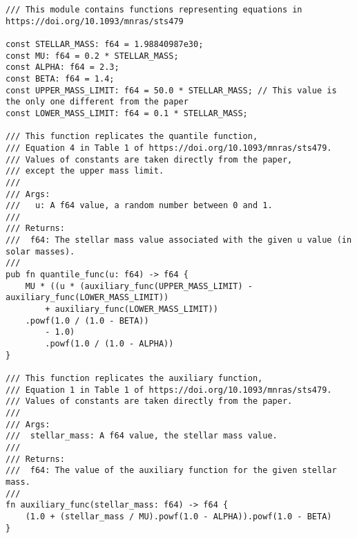 \begin{lstlisting}
/// This module contains functions representing equations in https://doi.org/10.1093/mnras/sts479

const STELLAR_MASS: f64 = 1.98840987e30;
const MU: f64 = 0.2 * STELLAR_MASS;
const ALPHA: f64 = 2.3;
const BETA: f64 = 1.4;
const UPPER_MASS_LIMIT: f64 = 50.0 * STELLAR_MASS; // This value is the only one different from the paper
const LOWER_MASS_LIMIT: f64 = 0.1 * STELLAR_MASS;

/// This function replicates the quantile function,
/// Equation 4 in Table 1 of https://doi.org/10.1093/mnras/sts479.
/// Values of constants are taken directly from the paper,
/// except the upper mass limit.
///
/// Args:
///   u: A f64 value, a random number between 0 and 1.
///
/// Returns:
///  f64: The stellar mass value associated with the given u value (in solar masses).
///
pub fn quantile_func(u: f64) -> f64 {
    MU * ((u * (auxiliary_func(UPPER_MASS_LIMIT) - auxiliary_func(LOWER_MASS_LIMIT))
        + auxiliary_func(LOWER_MASS_LIMIT))
    .powf(1.0 / (1.0 - BETA))
        - 1.0)
        .powf(1.0 / (1.0 - ALPHA))
}

/// This function replicates the auxiliary function,
/// Equation 1 in Table 1 of https://doi.org/10.1093/mnras/sts479.
/// Values of constants are taken directly from the paper.
///
/// Args:
///  stellar_mass: A f64 value, the stellar mass value.
///
/// Returns:
///  f64: The value of the auxiliary function for the given stellar mass.
///
fn auxiliary_func(stellar_mass: f64) -> f64 {
    (1.0 + (stellar_mass / MU).powf(1.0 - ALPHA)).powf(1.0 - BETA)
}
\end{lstlisting}